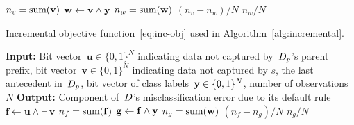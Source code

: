 \begin{arxiv}
\begin{algorithm}[t!]
\begin{algorithmic}
    \State $n_v = \textnormal{sum}(\mathbf{v})$ 
    \State $\mathbf{w} \gets \mathbf{v} \wedge \mathbf{y}$ 
    \State $n_w = \textnormal{sum}(\mathbf{w})$ 
        \State \Return $(n_v - n_w) / N$ 
    \Else
        \State \Return $n_w / N$ 
    \EndIf
    \EndFunction
\end{algorithmic}
\end{algorithm}

\begin{algorithm}[t!]
  \caption{Incremental objective function~\eqref{eq:inc-obj} used in Algorithm~\ref{alg:incremental}.}
\label{alg:incremental-obj}
\begin{algorithmic}
\normalsize
\State \textbf{Input:}
Bit vector~${\mathbf{u} \in \{0, 1\}^N}$ indicating data not captured by~$D_p$'s parent prefix,
bit vector~${\mathbf{v} \in \{0, 1\}^N}$ indicating data not captured by $s$, the last antecedent in~$D_p$,
bit vector of class labels~${\mathbf{y} \in \{0, 1\}^N}$,
number of observations~$N$
\State \textbf{Output:} Component of~${D}$'s misclassification error due to its default rule \\

    \State $\mathbf{f} \gets \mathbf{u} \wedge \neg\,\mathbf{v} $ 
    \State $n_f = \textnormal{sum}(\mathbf{f})$ 
    \State $\mathbf{g} \gets \mathbf{f} \wedge \mathbf{y}$ 
    \State $n_g = \textnormal{sum}(\mathbf{w})$ 
        \State \Return $(n_f - n_g) / N$ 
    \Else
        \State \Return $n_g / N$ 
    \EndIf
\EndFunction
\end{algorithmic}
\end{algorithm}


\end{arxiv}
